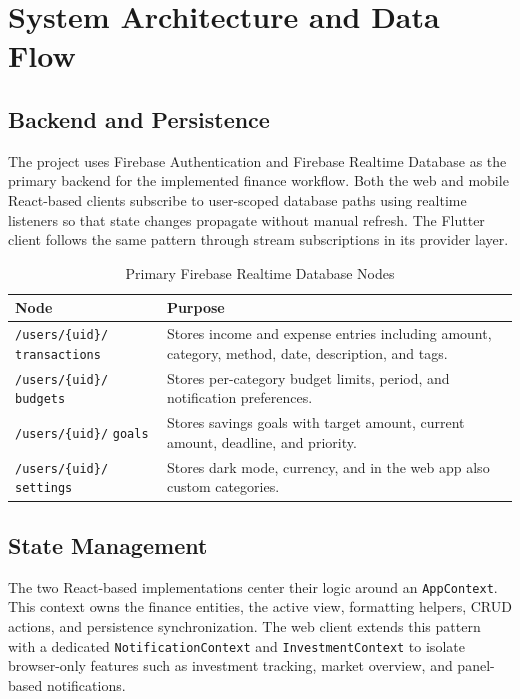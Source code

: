 \documentclass[conference]{IEEEtran}
\begin{document}
\section{System Architecture and Data Flow}
\subsection{Backend and Persistence}
The project uses Firebase Authentication and Firebase Realtime Database as the primary backend for the implemented finance workflow. Both the web and mobile React-based clients subscribe to user-scoped database paths using realtime listeners so that state changes propagate without manual refresh. The Flutter client follows the same pattern through stream subscriptions in its provider layer.

\begin{table}[t]
\caption{Primary Firebase Realtime Database Nodes}
\label{tab:firebase}
\centering
\begin{tabular}{p{2.2cm}p{4.9cm}}
\toprule
\textbf{Node} & \textbf{Purpose} \\
\midrule
\texttt{/users/\{uid\}/} \newline \texttt{transactions} & Stores income and expense entries including amount, category, method, date, description, and tags. \\
\texttt{/users/\{uid\}/} \newline \texttt{budgets} & Stores per-category budget limits, period, and notification preferences. \\
\texttt{/users/\{uid\}/} \newline \texttt{goals} & Stores savings goals with target amount, current amount, deadline, and priority. \\
\texttt{/users/\{uid\}/} \newline \texttt{settings} & Stores dark mode, currency, and in the web app also custom categories. \\
\bottomrule
\end{tabular}
\end{table}

\subsection{State Management}
The two React-based implementations center their logic around an \texttt{AppContext}. This context owns the finance entities, the active view, formatting helpers, CRUD actions, and persistence synchronization. The web client extends this pattern with a dedicated \texttt{NotificationContext} and \texttt{InvestmentContext} to isolate browser-only features such as investment tracking, market overview, and panel-based notifications.
\end{document}
